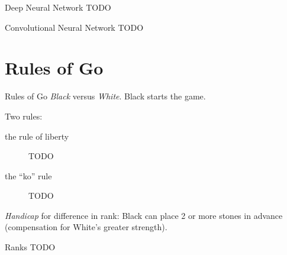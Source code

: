 \documentclass{beamer}
\newcommand{\todo}{\alert{TODO}}
\begin{document}
  \begin{frame}{Deep Neural Network}
    \todo
  \end{frame}

  \begin{frame}{Convolutional Neural Network}
    \todo
  \end{frame}


  \section{Rules of Go}
  \begin{frame}{Rules of Go}
    \emph{Black} versus \emph{White}.
    Black starts the game.

    \pause
    Two rules:
    \begin{description}
      \item [the rule of liberty] \todo
      \item [the ``ko'' rule] \todo
    \end{description}

    \pause
    \emph{Handicap} for difference in rank:
    Black can place 2 or more stones in advance (compensation for White's greater strength).
  \end{frame}

  \begin{frame}{Ranks}
    \todo
  \end{frame}

\end{document}
